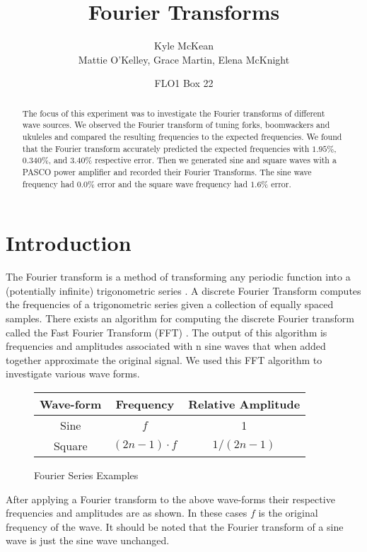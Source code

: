 \documentclass{article}
\title{Fourier Transforms}
\author{Kyle McKean \\ \normalsize Mattie O'Kelley, Grace Martin, Elena McKnight}
\date{\normalsize FLO1 Box 22}
\newcommand{\tableFrac}[2]{\ensuremath{#1/#2}}
\begin{document}
\maketitle
\begin{abstract}
  The focus of this experiment was to investigate the Fourier transforms of
  different wave sources. We observed the Fourier transform of tuning forks,
  boomwackers and ukuleles and compared the resulting frequencies to the expected
  frequencies. We found that the Fourier transform accurately predicted the
  expected frequencies with $1.95\%$, $0.340\%$, and $3.40\%$ respective error.
  Then we generated sine and square waves with a PASCO power amplifier and
  recorded their Fourier Transforms. The sine wave frequency had $0.0\%$ error and
  the square wave frequency had $1.6\%$ error.
\end{abstract}
\section{Introduction}
The Fourier transform is a method of transforming any periodic function into a
(potentially infinite) trigonometric series \cite{wolfram:1}. A discrete Fourier
Transform computes the frequencies of a trigonometric series given a collection
of equally spaced samples. There exists an algorithm for computing the discrete
Fourier transform called the Fast Fourier Transform (FFT) \cite{cooley:1}. The
output of this algorithm is frequencies and amplitudes associated with n sine
waves that when added together approximate the original signal. We used this FFT
algorithm to investigate various wave forms.

\begin{figure}[h]
  \centering
  \caption{Fourier Series Examples}
  \begin{tabular}{|c|c|c|}
    \hline
    Wave-form & Frequency          & Relative Amplitude \\
    \hline
    Sine     & $f$                & 1 \\
    Square   & $(2n - 1) \cdot f$ & $\tableFrac{1}{(2n - 1)}$ \\
    \hline
  \end{tabular}
  \label{fig:fourier-series}
\end{figure}

After applying a Fourier transform to the above wave-forms their respective
frequencies and amplitudes are as shown. In these cases $f$ is the original frequency
of the wave. It should be noted that the Fourier transform of a sine wave is
just the sine wave unchanged.
\end{document}
